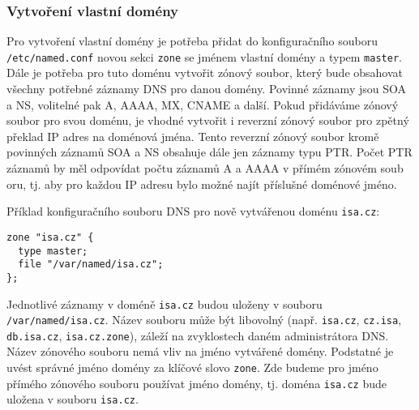 
\subsubsection{Vytvoření vlastní domény}\label{sec:vlastni_zona}
Pro vytvoření vlastní domény je potřeba přidat do konfiguračního souboru {\tt /etc/named.conf} novou sekci {\tt zone} se jménem vlastní domény a typem {\tt master}. Dále je potřeba pro tuto doménu vytvořit zónový soubor, který bude obsahovat všechny potřebné záznamy DNS pro danou domény. Povinné záznamy jsou SOA a NS, volitelné pak A, AAAA, MX, CNAME a další. Pokud přidáváme  zónový soubor pro svou doménu, je vhodné vytvořit i reverzní zónový soubor pro zpětný překlad IP adres na doménová jména. Tento reverzní zónový soubor kromě povinných záznamů SOA a NS obsahuje dále jen záznamy typu PTR. Počet PTR záznamů by měl odpovídat počtu záznamů A a AAAA v přímém zónovém soub
oru, tj. aby pro každou IP adresu bylo možné najít příslušné doménové jméno. 

Příklad konfiguračního souboru DNS pro nově vytvářenou doménu {\tt isa.cz}:
\begin{verbatim}
zone "isa.cz" {
  type master;
  file "/var/named/isa.cz";
};
\end{verbatim}

Jednotlivé záznamy v doméně {\tt isa.cz} budou uloženy v souboru {\tt /var/named/isa.cz}. Název souboru může být libovolný (např. {\tt isa.cz}, {\tt cz.isa}, {\tt db.isa.cz}, {\tt isa.cz.zone}), záleží na zvyklostech daném administrátora DNS. Název zónového souboru nemá vliv na jméno vytvářené domény. Podstatné je uvést správné jméno domény za klíčové slovo {\tt zone}. Zde budeme pro jméno přímého zónového souboru používat jméno domény, tj. doména {\tt isa.cz} bude uložena v souboru {\tt isa.cz}. 


